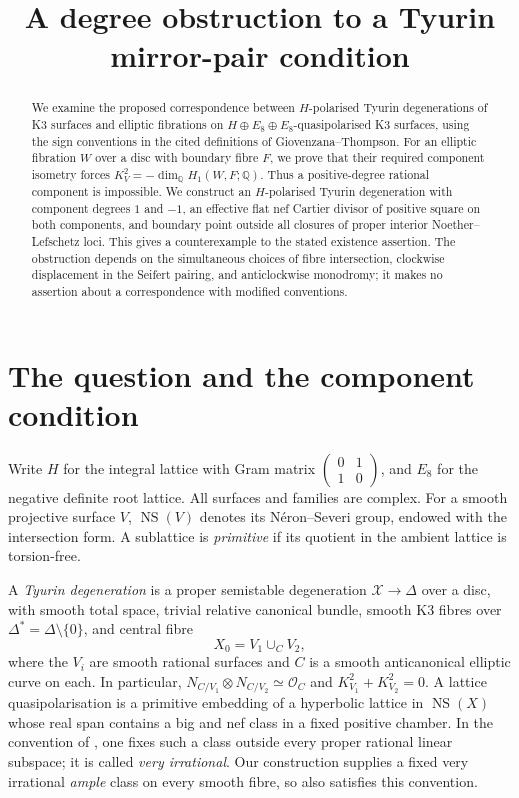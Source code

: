 \documentclass[11pt]{article}
\title{A degree obstruction to a Tyurin mirror-pair condition}
\author{}
\date{}
\theoremstyle{definition}
\theoremstyle{remark}
\newcommand{\Q}{\mathbb Q}
\newcommand{\NS}{\operatorname{NS}}
\newcommand{\OO}{\mathcal O}
\begin{document}
\maketitle

\begin{abstract}
We examine the proposed correspondence between $H$-polarised Tyurin degenerations of K3 surfaces and elliptic fibrations on $H\oplus E_8\oplus E_8$-quasipolarised K3 surfaces, using the sign conventions in the cited definitions of Giovenzana--Thompson. For an elliptic fibration $W$ over a disc with boundary fibre $F$, we prove that their required component isometry forces $K_V^2=-\dim_{\Q}H_1(W,F;\Q)$. Thus a positive-degree rational component is impossible. We construct an $H$-polarised Tyurin degeneration with component degrees $1$ and $-1$, an effective flat nef Cartier divisor of positive square on both components, and boundary point outside all closures of proper interior Noether--Lefschetz loci. This gives a counterexample to the stated existence assertion. The obstruction depends on the simultaneous choices of fibre intersection, clockwise displacement in the Seifert pairing, and anticlockwise monodromy; it makes no assertion about a correspondence with modified conventions.
\end{abstract}

\section{The question and the component condition}

Write $H$ for the integral lattice with Gram matrix $\left(\begin{smallmatrix}0&1\\1&0\end{smallmatrix}\right)$, and $E_8$ for the negative definite root lattice. All surfaces and families are complex. For a smooth projective surface $V$, $\NS(V)$ denotes its N\'eron--Severi group, endowed with the intersection form. A sublattice is \emph{primitive} if its quotient in the ambient lattice is torsion-free.

A \emph{Tyurin degeneration} is a proper semistable degeneration $\mathcal X\to\Delta$ over a disc, with smooth total space, trivial relative canonical bundle, smooth K3 fibres over $\Delta^*=\Delta\setminus\{0\}$, and central fibre
\[
X_0=V_1\cup_C V_2,
\]
where the $V_i$ are smooth rational surfaces and $C$ is a smooth anticanonical elliptic curve on each. In particular, $N_{C/V_1}\otimes N_{C/V_2}\simeq\OO_C$ and $K_{V_1}^2+K_{V_2}^2=0$.
A lattice quasipolarisation is a primitive embedding of a hyperbolic lattice in $\NS(X)$ whose real span contains a big and nef class in a fixed positive chamber. In the convention of \cite[\S2B]{AE}, one fixes such a class outside every proper rational linear subspace; it is called \emph{very irrational}. Our construction supplies a fixed very irrational \emph{ample} class on every smooth fibre, so also satisfies this convention.
\end{document}
